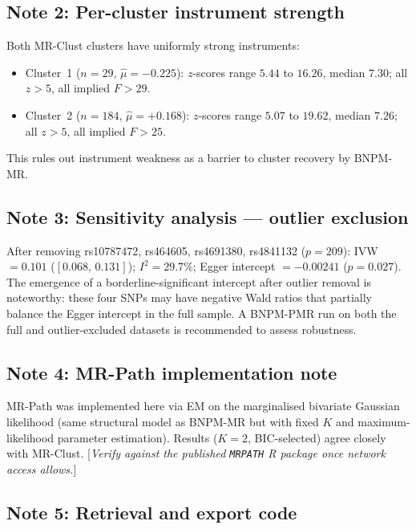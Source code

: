\documentclass[12pt,a4paper]{article}
\newcommand{\todo}[1]{\textcolor{notecol}{[\textit{#1}]}}
\begin{document}
\subsection*{Note 2: Per-cluster instrument strength}

Both MR-Clust clusters have uniformly strong instruments:
\begin{itemize}
  \item Cluster~1 ($n=29$, $\hat\mu=-0.225$): $z$-scores range $5.44$
        to $16.26$, median $7.30$; all $z > 5$, all implied $F > 29$.
  \item Cluster~2 ($n=184$, $\hat\mu=+0.168$): $z$-scores range $5.07$
        to $19.62$, median $7.26$; all $z > 5$, all implied $F > 25$.
\end{itemize}
This rules out instrument weakness as a barrier to cluster recovery by
BNPM-MR.

\subsection*{Note 3: Sensitivity analysis --- outlier exclusion}

After removing rs10787472, rs464605, rs4691380, rs4841132 ($p = 209$):
IVW $= 0.101$ ($[0.068,\, 0.131]$); $I^2 = 29.7\%$;
Egger intercept $= -0.00241$ ($p = 0.027$).  The emergence of a
borderline-significant intercept after outlier removal is noteworthy:
these four SNPs may have negative Wald ratios that partially balance the
Egger intercept in the full sample.  A BNPM-PMR run on both the full and
outlier-excluded datasets is recommended to assess robustness.

\subsection*{Note 4: MR-Path implementation note}

MR-Path was implemented here via EM on the marginalised bivariate Gaussian
likelihood (same structural model as BNPM-MR but with fixed $K$ and
maximum-likelihood parameter estimation).  Results ($K=2$, BIC-selected)
agree closely with MR-Clust.  \todo{Verify against the published
\texttt{MRPATH} R package once network access allows.}

\subsection*{Note 5: Retrieval and export code}
\end{document}
